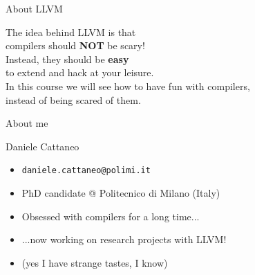 \begin{frame}[t]{About LLVM}
  \begin{center}
  	\vfill
  	\large
  	The idea behind LLVM is that \\ compilers should \textbf{NOT} be scary! \\
		\bigskip
		Instead, they should be \textbf{easy} \\ to extend and hack at your leisure. \\
		\bigskip
		In this course we will see how to have fun with compilers, \\instead of being scared of them.
		\vfill
  \end{center}
\end{frame}

\begin{frame}[t]{About me}
  \begin{large}
  \begin{center}
    Daniele Cattaneo
  \end{center}
  \end{large}
  \vspace{0.5em}
  \begin{center}
  \begin{varwidth}{8cm}
    \begin{itemize}
    \item \texttt{daniele.cattaneo@polimi.it}
    \item PhD candidate @ Politecnico di Milano (Italy)
    \item Obsessed with compilers for a long time...
    \item ...now working on research projects with LLVM!
    \item (yes I have strange tastes, I know)
  \end{itemize}
  \end{varwidth}
  \end{center}
\end{frame}

